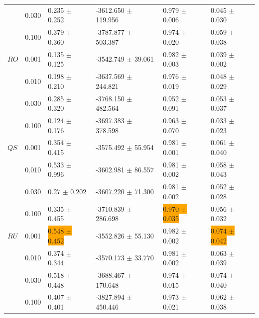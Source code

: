 \documentclass[shortabstract]{iithesis}
\begin{document}
\begin{table}[!ht]
\begin{tabular}{llllll}
        & 0.030 &  0.235 $\pm$ 0.252 &   -3612.650 $\pm$ 119.956 &  0.979 $\pm$ 0.006 &   0.045 $\pm$ 0.030 \\
        & 0.100 &   0.379 $\pm$ 0.360 &  -3787.877 $\pm$ 503.387 &   0.974 $\pm$ 0.020 &  0.059 $\pm$ 0.038 \\
$RO$ & 0.001 &  0.135 $\pm$ 0.125 &   -3542.749 $\pm$ 39.061 &  0.982 $\pm$ 0.003 &   0.039 $\pm$ 0.002 \\
        & 0.010 &   0.198 $\pm$ 0.210 &  -3637.569 $\pm$ 244.821 &  0.976 $\pm$ 0.019 &  0.048 $\pm$ 0.029 \\
        & 0.030 &   0.285 $\pm$ 0.320 &   -3768.150 $\pm$ 482.564 &  0.952 $\pm$ 0.091 &  0.053 $\pm$ 0.037 \\
        & 0.100 &  0.124 $\pm$ 0.176 &  -3697.383 $\pm$ 378.598 &   0.963 $\pm$ 0.070 &  0.033 $\pm$ 0.023 \\
$QS$ & 0.001 &  0.354 $\pm$ 0.415 &   -3575.492 $\pm$ 55.954 &  0.981 $\pm$ 0.001 &   0.061 $\pm$ 0.040 \\
        & 0.010 &  0.533 $\pm$ 0.996 &   -3602.981 $\pm$ 86.557 &  0.981 $\pm$ 0.002 &  0.058 $\pm$ 0.043 \\
        & 0.030 &   0.27 $\pm$ 0.202 &      -3607.220 $\pm$ 71.300 &  0.981 $\pm$ 0.002 &  0.052 $\pm$ 0.028 \\
        & 0.100 &  0.335 $\pm$ 0.455 &  -3710.839 $\pm$ 286.698 &   \colorbox{orange}{0.970 $\pm$ 0.035} &  0.056 $\pm$ 0.032 \\
$RU$ & 0.001 &  \colorbox{orange}{0.548 $\pm$ 0.452} &    -3552.826 $\pm$ 55.130 &  0.982 $\pm$ 0.002 &  \colorbox{orange}{0.074 $\pm$ 0.042} \\
        & 0.010 &  0.374 $\pm$ 0.344 &    -3570.173 $\pm$ 33.770 &  0.981 $\pm$ 0.002 &  0.063 $\pm$ 0.039 \\
        & 0.030 &  0.518 $\pm$ 0.448 &  -3688.467 $\pm$ 170.648 &  0.974 $\pm$ 0.015 &   0.074 $\pm$ 0.040 \\
        & 0.100 &  0.407 $\pm$ 0.401 &  -3827.894 $\pm$ 450.446 &  0.973 $\pm$ 0.021 &  0.062 $\pm$ 0.038 \\ \hline
\end{tabular}
\label{tab:res_0_4}
\end{table}

\pagebreak 
\end{document}
